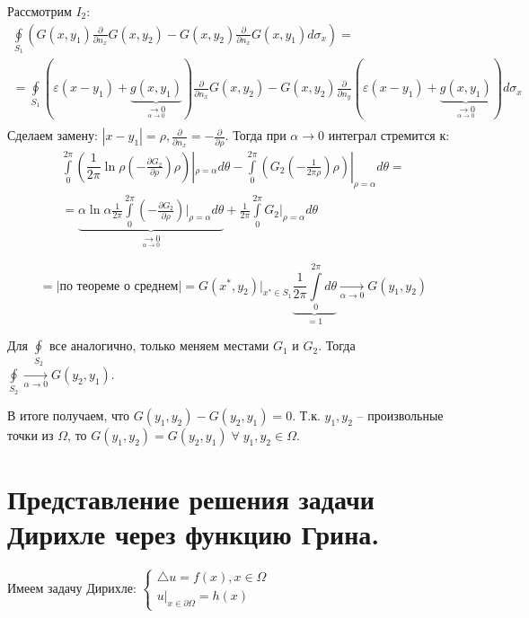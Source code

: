 \begin{Proof}
	Рассмотрим $I_2$:
	$$\begin{gathered} 
		\oint \limits_{S_1} \left(G(x, y_1) \frac{\partial}{\partial n_x} G(x, y_2) - G(x, y_2) \frac{\partial}{\partial n_x} G(x, y_1) d \sigma_x \right) = \\
		=\oint \limits_{S_1} (\varepsilon (x - y_1) + \underbrace{g(x, y_1)}_{\underset{\alpha \rightarrow 0}{\longrightarrow 0}}) \frac{\partial}{\partial n_x} G(x, y_2) - G(x, y_2) \frac{\partial}{\partial n_y} (\varepsilon (x - y_1) + \underbrace{g(x, y_1)}_{\underset{\alpha \rightarrow 0}{\longrightarrow 0}}) d \sigma_x \\
	\end{gathered}$$
	Сделаем замену: $|x - y_1| = \rho, \frac{\partial}{\partial n_x} = - \frac{\partial}{\partial \rho}$. Тогда при $\alpha \to 0$ интеграл стремится к:
	$$\begin{gathered} \int \limits_{0}^{2 \pi} ( \dfrac{1}{2 \pi} \ln \rho ( - \frac{\partial G_2}{\partial \rho} ) \rho) |_{\rho = \alpha} d \theta - \int \limits_{0}^{2 \pi} ( G_2 ( - \frac{1}{2 \pi \rho} ) \rho) |_{\rho = \alpha} d \theta  = \\
	= \underbrace{\alpha \ln \alpha \frac{1}{2 \pi} \int \limits_{0}^{2 \pi}(- \frac{\partial G_2}{\partial \rho}) |_{\rho = \alpha} d \theta}_{\underset{\alpha \rightarrow 0}{\longrightarrow 0}} + \frac{1}{2 \pi} \int \limits_{0}^{2 \pi} G_2 |_{\rho = \alpha} d \theta
	 \end{gathered}$$ 

	$$ = \Big|\text{по теореме о среднем}\Big| =  G(x^*, y_2) |_{x^* \in S_1} \underbrace{\frac{1}{2 \pi} \int \limits_{0}^{2 \pi} d \theta}_{=1} \xrightarrow[\alpha \to 0]{} G(y_1, y_2) $$

	Для $\oint \limits_{S_2}$ все аналогично, только меняем местами $ G_1 $ и $ G_2 $. Тогда $\oint \limits_{S_2} \underset{\alpha \rightarrow 0}{\longrightarrow} G(y_2, y_1)$.
	
	В итоге получаем, что $G(y_1, y_2) - G(y_2, y_1) = 0$. Т.к. $ y_1, y_2 $ -- произвольные точки из $\Omega$, то $G(y_1, y_2) = G(y_2, y_1) \; \forall \; y_1, y_2 \in \Omega.$

\end{Proof}

\section*{Представление решения задачи Дирихле через функцию Грина.}

Имеем задачу Дирихле: 
$\begin{cases}
	\triangle u = f (x) , x \in \Omega\\
	u|_{x \in \partial \Omega} = h(x)
\end{cases}$\\

